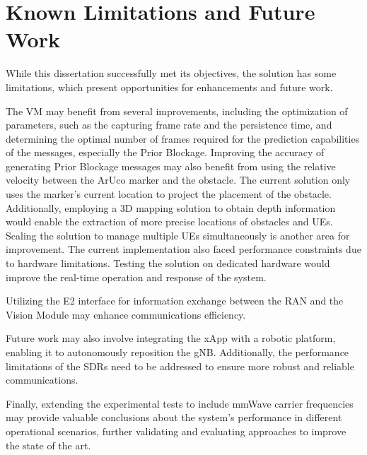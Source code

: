 \section{Known Limitations and Future Work}\label{sec:fut_work}
While this dissertation successfully met its objectives, the solution has some limitations, which present opportunities for enhancements and future work.

The VM may benefit from several improvements, including the optimization of parameters, such as the capturing frame rate and the persistence time, and determining the optimal number of frames required for the prediction capabilities of the messages, especially the Prior Blockage.
Improving the accuracy of generating Prior Blockage messages may also benefit from using the relative velocity between the ArUco marker and the obstacle.
The current solution only uses the marker's current location to project the placement of the obstacle.
Additionally, employing a 3D mapping solution to obtain depth information would enable the extraction of more precise locations of obstacles and UEs.
Scaling the solution to manage multiple UEs simultaneously is another area for improvement.
The current implementation also faced performance constraints due to hardware limitations.
Testing the solution on dedicated hardware would improve the real-time operation and response of the system.

Utilizing the E2 interface for information exchange between the RAN and the Vision Module may enhance communications efficiency.

Future work may also involve integrating the xApp with a robotic platform, enabling it to autonomously reposition the gNB\@.
Additionally, the performance limitations of the SDRs need to be addressed to ensure more robust and reliable communications.

Finally, extending the experimental tests to include mmWave carrier frequencies may provide valuable conclusions about the system's performance in different operational scenarios, further validating and evaluating approaches to improve the state of the art.





    


